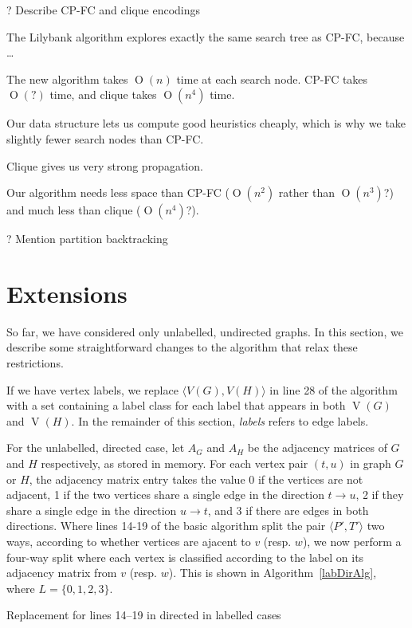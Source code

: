 \documentclass[letterpaper]{article}
\DeclareMathOperator{\V}{V}
\newcommand{\BigO}[1]{\ensuremath{\operatorname{O}\left(#1\right)}}
\begin{document}
? Describe CP-FC and clique encodings

The Lilybank algorithm explores exactly the same search tree as CP-FC, because \dots

The new algorithm takes $\BigO{n}$ time at each search node. CP-FC takes $\BigO{?}$ time,
and clique takes $\BigO{n^4}$ time.

Our data structure lets us compute good heuristics cheaply, which is why we take
slightly fewer search nodes than CP-FC.

Clique gives us very strong propagation.

Our algorithm needs less space than CP-FC ($\BigO{n^2}$ rather than $\BigO{n^3}$?) and
much less than clique ($\BigO{n^4}$?).

? Mention partition backtracking

\section{Extensions}\label{sec:extensions}

So far, we have considered only unlabelled, undirected graphs. In this section, we
describe some straightforward changes to the algorithm that relax these restrictions.

If we have vertex labels, we replace ${\langle V(G),V(H) \rangle}$ in line 28 of
the algorithm with a set containing a label class for each label that appears in
both $\V(G)$ and $\V(H)$. In the remainder of this section, \textit{labels} refers to
edge labels.

For the unlabelled, directed case, let $A_G$ and $A_H$ be the adjacency matrices
of $G$ and $H$ respectively, as stored in memory. For each
vertex pair $(t,u)$ in graph $G$ or $H$, the adjacency matrix entry 
takes the value 0 if the vertices are
not adjacent, 1 if the two vertices share a single edge in the direction $t
\rightarrow u$, 2 if they share a single edge in the direction $u \rightarrow
t$, and 3 if there are edges in both directions. Where lines 14-19 of the
basic algorithm split the pair $\langle P',T' \rangle$ two ways, according to whether
vertices are ajacent to $v$ (resp. $w$), we now perform a four-way split where
each vertex is classified according to the label on its adjacency matrix from $v$
(resp. $w$). This is shown in Algorithm~\ref{labDirAlg}, where $L=\{0,1,2,3\}$.

\begin{algorithm}
\DontPrintSemicolon
\nl    {}
\caption{Replacement for lines 14--19 in directed in labelled cases}
\label{labDirAlg}
\end{algorithm}
\end{document}
